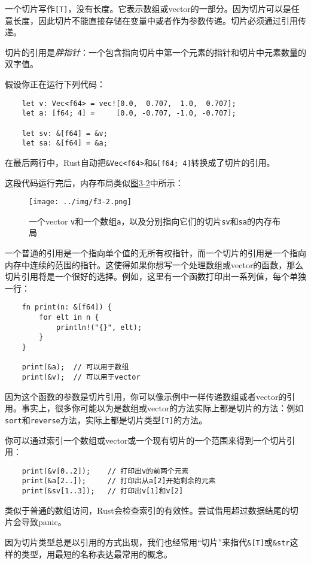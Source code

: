 一个切片写作\texttt{[T]}，没有长度。它表示数组或vector的一部分。因为切片可以是任意长度，因此切片不能直接存储在变量中或者作为参数传递。切片必须通过引用传递。

切片的引用是\emph{胖指针}：一个包含指向切片中第一个元素的指针和切片中元素数量的双字值。

假设你正在运行下列代码：
\begin{verbatim}
    let v: Vec<f64> = vec![0.0,  0.707,  1.0,  0.707];
    let a: [f64; 4] =     [0.0, -0.707, -1.0, -0.707];

    let sv: &[f64] = &v;
    let sa: &[f64] = &a;
\end{verbatim}

在最后两行中，Rust自动把\texttt{\&Vec<f64>}和\texttt{\&[f64; 4]}转换成了切片的引用。

这段代码运行完后，内存布局类似\hyperref[f3-2]{图3-2}中所示：
\begin{figure}[htbp]
    \centering
    \texttt{[image: ../img/f3-2.png]}
    \caption{一个vector \texttt{v}和一个数组\texttt{a}，以及分别指向它们的切片\texttt{sv}和\texttt{sa}的内存布局}
    \label{f3-2}
\end{figure}

一个普通的引用是一个指向单个值的无所有权指针，而一个切片的引用是一个指向内存中连续的范围的指针。这使得如果你想写一个处理数组或vector的函数，那么切片引用将是一个很好的选择。例如，这里有一个函数打印出一系列值，每个单独一行：
\begin{verbatim}
    fn print(n: &[f64]) {
        for elt in n {
            println!("{}", elt);
        }
    }

    print(&a);  // 可以用于数组
    print(&v);  // 可以用于vector
\end{verbatim}

因为这个函数的参数是切片引用，你可以像示例中一样传递数组或者vector的引用。事实上，很多你可能以为是数组或vector的方法实际上都是切片的方法：例如\texttt{sort}和\texttt{reverse}方法，实际上都是切片类型\texttt{[T]}的方法。

你可以通过索引一个数组或vector或一个现有切片的一个范围来得到一个切片引用：
\begin{verbatim}
    print(&v[0..2]);    // 打印出v的前两个元素
    print(&a[2..]);     // 打印出从a[2]开始剩余的元素
    print(&sv[1..3]);   // 打印出v[1]和v[2]
\end{verbatim}

类似于普通的数组访问，Rust会检查索引的有效性。尝试借用超过数据结尾的切片会导致panic。

因为切片类型总是以引用的方式出现，我们也经常用“切片”来指代\texttt{\&[T]}或\texttt{\&str}这样的类型，用最短的名称表达最常用的概念。

